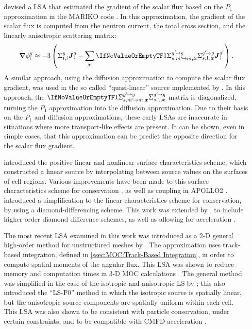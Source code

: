 {{{            \citeauthor{Petkov1998} devised a \ac{LSA} that estimated the gradient of the scalar flux based on the $P_1$ approximation in the MARIKO code \cite{Petkov1998,Petkov1999}.
            In this approximation, the gradient of the scalar flux is computed from the neutron current, the total cross section, and the linearly anisotropic scattering matrix:
            \begin{equation}\label{eq:MOC:LSA:Current2Gradient}
                \grad\sflux \approx -3\left(\xst\current - \suml[\gprime]\xss[1]\current[i][\gprime]\right).
            \end{equation}
            A similar approach, using the diffusion approximation to compute the scalar flux gradient, was used in the so called ``quasi-linear'' source implemented by \citet{Rabiti2009}.
            In this approach, the $\xss[1]$ matrix is diagonalized, turning the $P_1$ approximation into the diffusion approximation.
            Due to their basis on the $P_1$ and diffusion approximations, these early \acp{LSA} are inaccurate in situations where more transport-like effects are present.
            It can be shown, even in simple cases, that this approximation can be predict the opposite direction for the scalar flux gradient.

            \citet{Santandrea2002} introduced the positive linear and nonlinear surface characteristics scheme, which constructed a linear source by interpolating between source values on the surfaces of cell regions.
            Various improvements have been made to this surface characteristics scheme for conservation \cite{Santandrea2002}, as well as coupling in APOLLO2 \cite{Santandrea2008}.
            \citet{LeTellier2006} introduced a simplification to the linear characteristics scheme for conservation, by using a diamond-differencing scheme.
            This work was extended by \citet{Hebert2016}, to include higher-order diamond difference schemes, as well as allowing for acceleration \cite{Hebert2017}.

            The most recent \ac{LSA} examined in this work was introduced as a 2-D general high-order method for unstructured meshes by \citet{Masiello2009}.
            The approximation uses track-based integration, defined in \cref{ssec:MOC:Track-Based Integration}, in order to compute spatial moments of the angular flux.
            This \ac{LSA} was shown to reduce memory and computation times in 3-D \ac{MOC} calculations \cite{Chai2009}.
            The general method was simplified in the case of the isotropic and anisotropic \ac{LS} by \citet{Ferrer2016}; this also introduced the ``LS-P0'' method in which the isotropic source is spatially linear, but the anisotropic source components are spatially uniform within each cell.
            This \ac{LSA} was also shown to be consistent with particle conservation, under certain constraints, and to be compatible with \ac{CMFD} acceleration \cite{Ferrer2018}.

}}}
